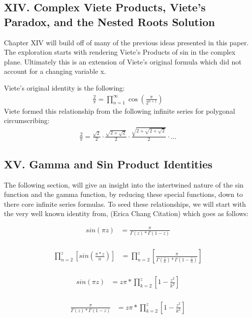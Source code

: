 \documentclass{article}
\begin{document}
\newpage
\subsection*{XIV. Complex Viete Products, Viete's Paradox, and the Nested Roots Solution}
Chapter XIV will build off of many of the previous ideas presented in this paper. The exploration starts with rendering Viete's Products of sin in the complex plane. Ultimately this is an extension of Viete's original formula which did not account for a changing variable x.

Viete's original identity is the following:
\begin{align*}
\frac{2}{\pi} = \prod_{n=1}^{\infty} \cos\left(\frac{\pi}{2^{n+1}}\right)
\end{align*}
Viete formed this relationship from the following infinite series for polygonal circumscribing:
\begin{align*}
\frac{2}{\pi} = \frac{\sqrt{2}}{2} \cdot \frac{\sqrt{2+\sqrt{2}}}{2} \cdot \frac{\sqrt{2+\sqrt{2+\sqrt{2}}}}{2} \cdot \ldots
\end{align*}
\newpage
\subsection*{XV. Gamma and Sin Product Identities}
The following section, will give an insight into the intertwined nature of the sin function and the gamma function, by reducing these special functions, down to there core infinite series formulas.
To seed these relationships, we will start with the very well known identity from, (Erica Chang Citation) which goes as follows:

\begin{align*}
sin(\pi z) &= \frac{\pi}{\Gamma\left(z\right) * \Gamma\left(1 - z\right)} \\
\end{align*}

\begin{align*}
\prod_{n=2}^z\left[sin(\frac{\pi * z}{n})\right] &= \prod_{n=2}^z\left[\frac{\pi}{\Gamma\left(\frac{z}{n}\right) * \Gamma\left(1 - \frac{z}{n}\right)}\right] \\
\end{align*}

\begin{align*}
sin(\pi z) &= z\pi * \prod_{k=2}^z\left[1 - \frac{z^2}{k^2}\right] \\
\end{align*}

\begin{align*}
\frac{\pi}{\Gamma\left(z\right) * \Gamma\left(1 - z\right)} &= z\pi * \prod_{k=2}^z\left[1 - \frac{z^2}{k^2}\right] \\
\end{align*}
\end{document}

